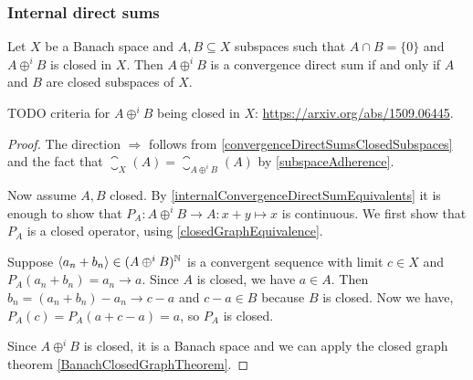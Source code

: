 \subsubsection{Internal direct sums}
\begin{proposition} \label{directSumClosedSubspacesBanachSpace}
Let $X$ be a Banach space and $A,B\subseteq X$ subspaces such that $A\cap B = \{0\}$ and $A\oplus^i B$ is closed in $X$. Then $A\oplus^i B$ is a convergence direct sum \textup{if and only if} $A$ and $B$ are closed subspaces of $X$.
\end{proposition}
TODO criteria for $A\oplus^i B$ being closed in $X$: \url{https://arxiv.org/abs/1509.06445}.
\begin{proof}
The direction $\Rightarrow$ follows from \ref{convergenceDirectSumsClosedSubspaces} and the fact that $\closure_X(A) = \closure_{A\oplus^i B}(A)$ by \ref{subspaceAdherence}.

Now assume $A,B$ closed. By \ref{internalConvergenceDirectSumEquivalents} it is enough to show that $P_A: A\oplus^i B \to A: x+y \mapsto x$ is continuous. We first show that $P_A$ is a closed operator, using \ref{closedGraphEquivalence}.

Suppose $\left\langle a_n+b_n \right\rangle \in (A\oplus^i B)^{\mathbb{N}}$ is a convergent sequence with limit $c\in X$ and $P_A(a_n+b_n) = a_n \to a$. Since $A$ is closed, we have $a\in A$. Then $b_n = (a_n+b_n)- a_n \to c-a$ and $c-a\in B$ because $B$ is closed. Now we have, $P_A(c) = P_A(a+c-a) = a$, so $P_A$ is closed.

Since $A\oplus^i B$ is closed, it is a Banach space and we can apply the closed graph theorem \ref{BanachClosedGraphTheorem}.
\end{proof}



